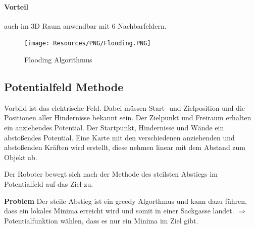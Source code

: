 \paragraph{Vorteil} auch im 3D Raum anwendbar mit 6 Nachbarfeldern.

\begin{figure}[H]
	\begin{center}
		\texttt{[image: Resources/PNG/Flooding.PNG]}
		\caption{Flooding Algorithmus}
		\label{fig:PNG/Flooding.PNG}
	\end{center}
\end{figure}

\subsection{Potentialfeld Methode}
Vorbild ist das elektrische Feld. Dabei müssen Start- und Zielposition und die
Positionen aller Hindernisse bekannt sein. Der Zielpunkt und Freiraum erhalten
ein anziehendes Potential. Der Startpunkt, Hindernisse und Wände ein abstoßendes
Potential. Eine Karte mit den verschiedenen anziehenden und abstoßenden Kräften
wird erstellt, diese nehmen linear mit dem Abstand zum Objekt ab.

Der Roboter bewegt sich nach der Methode des steilsten Abstiegs im Potentialfeld
auf das Ziel zu.

\textbf{Problem} Der steile Abstieg ist ein greedy Algorthmus und kann dazu
führen, dass ein lokales Minima erreicht wird und somit in einer Sackgasse
landet. $\Rightarrow$ Potentialfunktion wählen, dass es nur ein Minima im Ziel
gibt.

